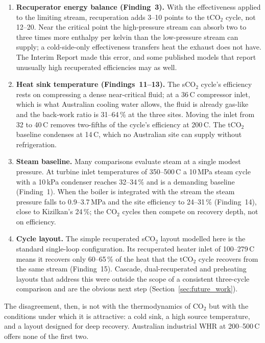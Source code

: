 \begin{enumerate}[leftmargin=1.8em,itemsep=4pt]
\item \textbf{Recuperator energy balance (Finding~3).} With the effectiveness
applied to the limiting stream, recuperation adds 3--10 points to the
tCO$_2$ cycle, not 12--20. Near the critical point the high-pressure stream
can absorb two to three times more enthalpy per kelvin than the low-pressure
stream can supply; a cold-side-only effectiveness transfers heat the exhaust
does not have. The Interim Report made this error, and some published
models that report unusually high recuperated efficiencies may as well.
\item \textbf{Heat sink temperature (Findings~11--13).} The sCO$_2$ cycle's
efficiency rests on compressing a dense near-critical fluid; at a
36\,\textdegree C compressor inlet, which is what Australian cooling water
allows, the fluid is already gas-like and the back-work ratio is 31--64\,\%
at the three sites. Moving the inlet from 32 to 40\,\textdegree C removes
two-fifths of the cycle's efficiency at 200\,\textdegree C. The tCO$_2$
baseline condenses at 14\,\textdegree C, which no Australian site can
supply without refrigeration.
\item \textbf{Steam baseline.} Many comparisons evaluate steam at a single
modest pressure. At turbine inlet temperatures of 350--500\,\textdegree C a
10\,MPa steam cycle with a 10\,kPa condenser reaches 32--34\,\% and is a
demanding baseline (Finding~1). When the boiler is integrated with the
stream the steam pressure falls to 0.9--3.7\,MPa and the site efficiency to
24--31\,\% (Finding~14), close to Kizilkan's 24\,\%; the CO$_2$ cycles then
compete on recovery depth, not on efficiency.
\item \textbf{Cycle layout.} The simple recuperated sCO$_2$ layout
modelled here is the standard single-loop configuration. Its recuperated
heater inlet of 100--279\,\textdegree C means it recovers only 60--65\,\% of
the heat that the tCO$_2$ cycle recovers from the same stream (Finding~15). Cascade, dual-recuperated and preheating layouts
that address this were outside the scope of a consistent three-cycle
comparison and are the obvious next step (Section~\ref{sec:future_work}).
\end{enumerate}

The disagreement, then, is not with the thermodynamics of CO$_2$ but with
the conditions under which it is attractive: a cold sink, a high source
temperature, and a layout designed for deep recovery. Australian industrial
WHR at 200--500\,\textdegree C offers none of the first two.

